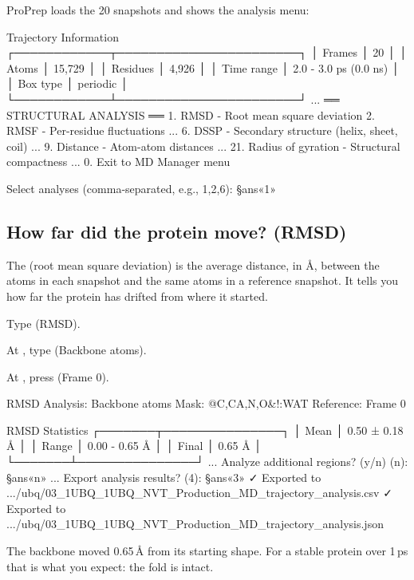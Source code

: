 ProPrep loads the 20 snapshots and shows the analysis menu:

\begin{screen}
        Trajectory Information
┌────────────┬───────────────────────┐
│ Frames     │ 20                    │
│ Atoms      │ 15,729                │
│ Residues   │ 4,926                 │
│ Time range │ 2.0 - 3.0 ps (0.0 ns) │
│ Box type   │ periodic              │
└────────────┴───────────────────────┘
...
══ STRUCTURAL ANALYSIS ══
   1. RMSD - Root mean square deviation
   2. RMSF - Per-residue fluctuations
...
   6. DSSP - Secondary structure (helix, sheet, coil)
...
   9. Distance - Atom-atom distances
...
  21. Radius of gyration - Structural compactness
...
   0. Exit to MD Manager menu

Select analyses (comma-separated, e.g., 1,2,6): §ans«1»
\end{screen}

\subsection{How far did the protein move? (RMSD)}

The  (root mean square deviation) is the average distance, in Å,
between the atoms in each snapshot and the same atoms in a reference
snapshot. It tells you how far the protein has drifted from where it started.

\begin{steps}[resume]
  \item Type  (RMSD).
  \item At , type  (Backbone atoms).
  \item At , press  (Frame 0).
\end{steps}

\begin{screen}
RMSD Analysis: Backbone atoms
Mask: @C,CA,N,O&!:WAT
Reference: Frame 0

     RMSD Statistics
┌───────┬───────────────┐
│ Mean  │ 0.50 ± 0.18 Å │
│ Range │ 0.00 - 0.65 Å │
│ Final │ 0.65 Å        │
└───────┴───────────────┘
...
Analyze additional regions? (y/n) (n): §ans«n»
...
Export analysis results? (4): §ans«3»
✓ Exported to .../ubq/03_1UBQ_1UBQ_NVT_Production_MD_trajectory_analysis.csv
✓ Exported to .../ubq/03_1UBQ_1UBQ_NVT_Production_MD_trajectory_analysis.json
\end{screen}

The backbone moved 0.65\,Å from its starting shape. For a stable protein over
1\,ps that is what you expect: the fold is intact.

